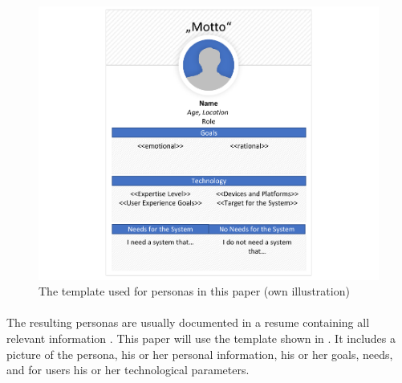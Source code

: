 \begin{figure}[H]
    \centering
    \includegraphics[scale=1]{img/PersonaTemplate.pdf}
    \caption[Template for Personas]{The template used for personas in this paper (own illustration)}
    \label{fig:persTemp}
\end{figure}

\paragraph{} The resulting personas are usually documented in a resume containing all relevant information \parencites[cf.][40]{Robier.2016}[cf.][]{Platt.2016}. This paper will use the template shown in . It includes a picture of the persona, his or her personal information, his or her goals, needs, and for users his or her technological parameters.


